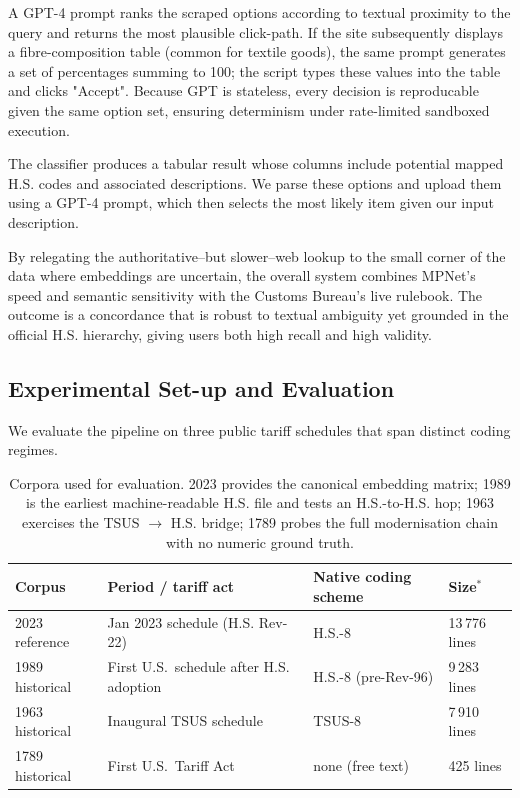 \documentclass[12pt]{article}
\begin{document}
 A GPT-4 prompt ranks the scraped options according to textual proximity to the query and returns the most plausible click-path. If the site subsequently displays a fibre-composition table (common for textile goods), the same prompt generates a set of percentages summing to 100; the script types these values into the table and clicks "Accept". Because GPT is stateless, every decision is reproducable given the same option set, ensuring determinism under rate-limited sandboxed execution. 

The classifier produces a tabular result whose columns include potential mapped H.S. codes and associated descriptions. We parse these options and upload them using a GPT-4 prompt, which then selects the most likely item given our input description. 
\newline

By relegating the authoritative--but slower--web lookup to the small corner of the data where embeddings are uncertain, the overall system combines MPNet's speed and semantic sensitivity with the Customs Bureau's live rulebook. The outcome is a concordance that is robust to textual ambiguity yet grounded in the official H.S. hierarchy, giving users both high recall and high validity. 

\subsection{Experimental Set-up and Evaluation}

We evaluate the pipeline on three public tariff schedules that span distinct coding regimes. 

\begin{table}[H]
    \centering
    \begin{tabular}{llll}
        \toprule
        \textbf{Corpus} & \textbf{Period / tariff act} & \textbf{Native coding scheme} & \textbf{Size}$^{\ast}$ \\
        \midrule
        2023 reference   & Jan 2023 schedule (H.S. Rev-22)          & H.S.-8                    & 13\,776 lines \\
        1989 historical  & First U.S.\ schedule after H.S. adoption & H.S.-8 (pre-Rev-96)       & 9\,283 lines  \\
        1963 historical  & Inaugural TSUS schedule                & TSUS-8                  & 7\,910 lines  \\
        1789 historical  & First U.S.\ Tariff Act                 & none (free text)        & 425 lines     \\
        \bottomrule
    \end{tabular}
    \caption{Corpora used for evaluation. 2023 provides the canonical embedding matrix; 1989 is the earliest machine-readable H.S. file and tests an H.S.-to-H.S. hop; 1963 exercises the TSUS $\rightarrow$ H.S. bridge; 1789 probes the full modernisation chain with no numeric ground truth.}
    \label{tab:datasets}
\end{table}
\end{document}
